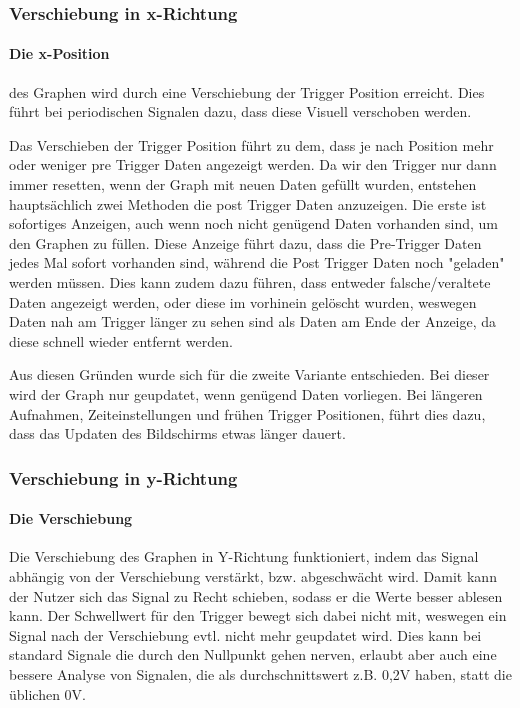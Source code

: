 \documentclass{article}
\begin{document}
\subsubsection{Verschiebung in x-Richtung}
\paragraph{Die x-Position}
des Graphen wird durch eine Verschiebung der Trigger Position erreicht. Dies führt bei periodischen Signalen dazu, dass diese Visuell verschoben werden. 

Das Verschieben der Trigger Position führt zu dem, dass je nach Position mehr oder weniger pre Trigger Daten angezeigt werden. Da wir den Trigger nur dann immer resetten, wenn der Graph mit neuen Daten gefüllt wurden, entstehen hauptsächlich zwei Methoden die post Trigger Daten anzuzeigen. Die erste ist sofortiges Anzeigen, auch wenn noch nicht genügend Daten vorhanden sind, um den Graphen zu füllen. Diese Anzeige führt dazu, dass die Pre-Trigger Daten jedes Mal sofort vorhanden sind, während die Post Trigger Daten noch "geladen" werden müssen. Dies kann zudem dazu führen, dass entweder falsche/veraltete Daten angezeigt werden, oder diese im vorhinein gelöscht wurden, weswegen Daten nah am Trigger länger zu sehen sind als Daten am Ende der Anzeige, da diese schnell wieder entfernt werden. 

Aus diesen Gründen wurde sich für die zweite Variante entschieden. Bei dieser wird der Graph nur geupdatet, wenn genügend Daten vorliegen. Bei längeren Aufnahmen, Zeiteinstellungen und frühen Trigger Positionen, führt dies dazu, dass das Updaten des Bildschirms etwas länger dauert.

\subsubsection{Verschiebung in y-Richtung}
\paragraph{Die Verschiebung}
Die Verschiebung des Graphen in Y-Richtung funktioniert, indem das Signal abhängig von der Verschiebung verstärkt, bzw. abgeschwächt wird. Damit kann der Nutzer sich das Signal zu Recht schieben, sodass er die Werte besser ablesen kann. Der Schwellwert für den Trigger bewegt sich dabei nicht mit, weswegen ein Signal nach der Verschiebung evtl. nicht mehr geupdatet wird. Dies kann bei standard Signale die durch den Nullpunkt gehen nerven, erlaubt aber auch eine bessere Analyse von Signalen, die als durchschnittswert z.B. 0,2V haben, statt die üblichen 0V.
\end{document}
